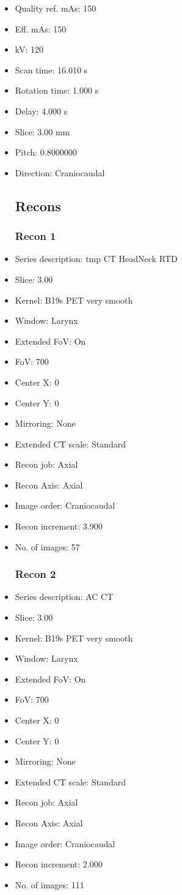 \documentclass[12pt]{article}
\begin{document}
\begin{itemize}
\subsection{Scan}
\item Quality ref. mAs: 150\item Eff. mAs: 150\item kV: 120\item Scan time: 16.010 s\item Rotation time: 1.000 s\item Delay: 4.000 s\item Slice: 3.00 mm\item Pitch: 0.8000000\item Direction: Craniocaudal\subsection{Recons}

\subsubsection{Recon 1}
\item Series description: tmp CT HeadNeck RTD
\item Slice: 3.00
\item Kernel: B19s PET very smooth
\item Window: Larynx
\item Extended FoV: On
\item FoV: 700
\item Center X: 0
\item Center Y: 0
\item Mirroring: None
\item Extended CT scale: Standard
\item Recon job: Axial
\item Recon Axis: Axial
\item Image order: Craniocaudal
\item Recon increment: 3.900
\item No. of images: 57
\subsubsection{Recon 2}
\item Series description: AC CT
\item Slice: 3.00
\item Kernel: B19s PET very smooth
\item Window: Larynx
\item Extended FoV: On
\item FoV: 700
\item Center X: 0
\item Center Y: 0
\item Mirroring: None
\item Extended CT scale: Standard
\item Recon job: Axial
\item Recon Axis: Axial
\item Image order: Craniocaudal
\item Recon increment: 2.000
\item No. of images: 111

\end{itemize}
\end{document}
